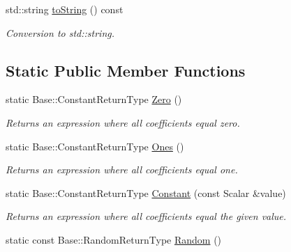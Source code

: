 \begin{DoxyCompactItemize}
\item 
std\+::string \hyperlink{classow__core_1_1VectorDof_aca0f060adbac385e9ef350947248041c}{to\+String} () const \hypertarget{classow__core_1_1VectorDof_aca0f060adbac385e9ef350947248041c}{}\label{classow__core_1_1VectorDof_aca0f060adbac385e9ef350947248041c}

\begin{DoxyCompactList}\small\item\em Conversion to std\+::string. \end{DoxyCompactList}\end{DoxyCompactItemize}
\subsection*{Static Public Member Functions}
\begin{DoxyCompactItemize}
\item 
static Base\+::\+Constant\+Return\+Type \hyperlink{classow__core_1_1VectorDof_a9e6be2c39b494db7b7d4ed62bdf6cbe3}{Zero} ()
\begin{DoxyCompactList}\small\item\em Returns an expression where all coefficients equal zero. \end{DoxyCompactList}\item 
static Base\+::\+Constant\+Return\+Type \hyperlink{classow__core_1_1VectorDof_abbb267905416971fa0edd4224f3cf428}{Ones} ()\hypertarget{classow__core_1_1VectorDof_abbb267905416971fa0edd4224f3cf428}{}\label{classow__core_1_1VectorDof_abbb267905416971fa0edd4224f3cf428}

\begin{DoxyCompactList}\small\item\em Returns an expression where all coefficients equal one. \end{DoxyCompactList}\item 
static Base\+::\+Constant\+Return\+Type \hyperlink{classow__core_1_1VectorDof_afa6d09d81da823ac3ea27b431a3e3a42}{Constant} (const Scalar \&value)\hypertarget{classow__core_1_1VectorDof_afa6d09d81da823ac3ea27b431a3e3a42}{}\label{classow__core_1_1VectorDof_afa6d09d81da823ac3ea27b431a3e3a42}

\begin{DoxyCompactList}\small\item\em Returns an expression where all coefficients equal the given value. \end{DoxyCompactList}\item 
static const Base\+::\+Random\+Return\+Type \hyperlink{classow__core_1_1VectorDof_af30f677b67b4b2a3d50dd58d17f13dd4}{Random} ()\hypertarget{classow__core_1_1VectorDof_af30f677b67b4b2a3d50dd58d17f13dd4}{}\label{classow__core_1_1VectorDof_af30f677b67b4b2a3d50dd58d17f13dd4}


\end{DoxyCompactItemize}
